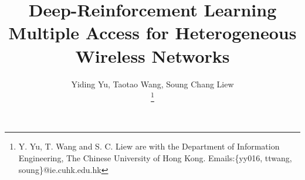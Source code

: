 \documentclass[journal,comsoc]{IEEEtran}
\begin{document}
\title{Deep-Reinforcement Learning Multiple Access for Heterogeneous Wireless Networks}

%
\author{Yiding Yu, Taotao Wang, Soung Chang Liew\\
\thanks{Y. Yu, T. Wang and S. C. Liew are with the Department of Information Engineering, The Chinese University of Hong Kong. Emails:\{yy016, ttwang, soung\}@ie.cuhk.edu.hk}
}

% 
%
\end{document}
